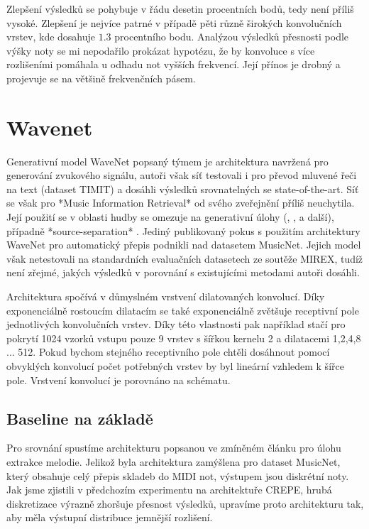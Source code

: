 Zlepšení výsledků se pohybuje v řádu desetin procentních bodů, tedy není příliš vysoké. Zlepšení je nejvíce patrné v případě pěti různě širokých konvolučních vrstev, kde dosahuje $1.3$ procentního bodu. Analýzou výsledků přesnosti podle výšky noty se mi nepodařilo prokázat hypotézu, že by konvoluce s více rozlišeními pomáhala u odhadu not vyšších frekvencí. Její přínos je drobný a projevuje se na většině frekvenčních pásem.


\section{Wavenet}

Generativní model WaveNet popsaný týmem \cite{Oord2016} je architektura navržená pro generování zvukového signálu, autoři však síť testovali i pro převod mluvené řeči na text (dataset TIMIT) a dosáhli výsledků srovnatelných se state-of-the-art. Síť se však pro *Music Information Retrieval* od svého zveřejnění příliš neuchytila. Její použití se v oblasti hudby se omezuje na generativní úlohy (\cite{Hawthorne2018a}, \cite{Yang2017}, \cite{Engel2017} a další), případně *source-separation* \citep{Stoller2018}. Jediný publikovaný pokus s použitím architektury WaveNet pro automatický přepis podnikli \cite{Martak2018} nad datasetem MusicNet. Jejich model však netestovali na standardních evaluačních datasetech ze soutěže MIREX, tudíž není zřejmé, jakých výsledků v porovnání s existujícími metodami autoři dosáhli.

Architektura spočívá v důmyslném vrstvení dilatovaných konvolucí. Díky exponenciálně rostoucím dilatacím se také exponenciálně zvětšuje receptivní pole jednotlivých konvolučních vrstev. Díky této vlastnosti pak například stačí pro pokrytí 1024 vzorků vstupu pouze 9 vrstev s šířkou kernelu 2 a dilatacemi 1,2,4,8 ... 512. Pokud bychom stejného receptivního pole chtěli dosáhnout pomocí obvyklých konvolucí počet potřebných vrstev by byl lineární vzhledem k šířce pole. Vrstvení konvolucí je porovnáno na schématu. 


\subsection{Baseline na základě \cite{Martak2018}}

Pro srovnání spustíme architekturu popsanou ve zmíněném článku pro úlohu extrakce melodie. Jelikož byla architektura zamýšlena pro dataset MusicNet, který obsahuje celý přepis skladeb do MIDI not, výstupem jsou diskrétní noty. Jak jsme zjistili v předchozím experimentu na architektuře CREPE, hrubá diskretizace výrazně zhoršuje přesnost výsledků, upravíme proto architekturu tak, aby měla výstupní distribuce jemnější rozlišení.
